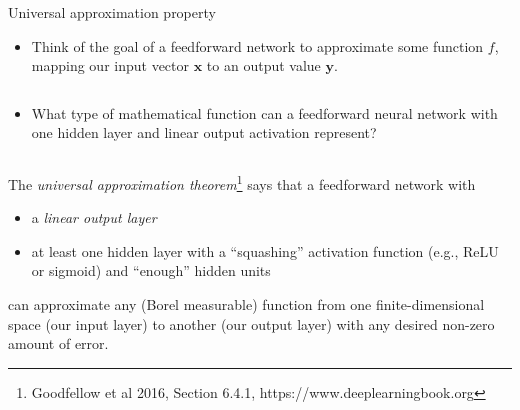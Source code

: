 \documentclass[
  10pt,
  ignorenonframetext,
]{beamer}
\providecommand{\tightlist}{%
  \setlength{\itemsep}{0pt}\setlength{\parskip}{0pt}}
\begin{document}
\begin{frame}
\begin{block}{Universal approximation property}
\protect\hypertarget{universal-approximation-property}{}
\(~\)

\begin{itemize}
\tightlist
\item
  Think of the goal of a feedforward network to approximate some
  function \(f\), mapping our input vector \({\boldsymbol x}\) to an
  output value \({\boldsymbol y}\).
\end{itemize}

\(~\)

\begin{itemize}
\tightlist
\item
  What type of mathematical function can a feedforward neural network
  with one hidden layer and linear output activation represent?
\end{itemize}

\(~\) \pause

The \emph{universal approximation
theorem}\footnote{Goodfellow et al 2016, Section 6.4.1, https://www.deeplearningbook.org}
says that a feedforward network with \vspace{2mm}

\begin{itemize}
\tightlist
\item
  a \emph{linear output layer}
\item
  at least one hidden layer with a ``squashing'' activation function
  (e.g., ReLU or sigmoid) and ``enough'' hidden units
\end{itemize}

\vspace{2mm}

can approximate any (Borel measurable) function from one
finite-dimensional space (our input layer) to another (our output layer)
with any desired non-zero amount of error.
\end{block}
\end{frame}
\end{document}

